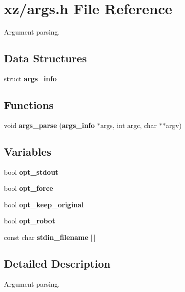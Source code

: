 \section{xz/args.h File Reference}
\label{args_8h}


Argument parsing.  


\subsection*{Data Structures}
\begin{DoxyCompactItemize}
\item 
struct {\bf args\-\_\-info}
\end{DoxyCompactItemize}
\subsection*{Functions}
\begin{DoxyCompactItemize}
\item 
void {\bfseries args\-\_\-parse} ({\bf args\-\_\-info} $\ast$args, int argc, char $\ast$$\ast$argv)\label{args_8h_a05c34191dc1aba862787f62481139730}

\end{DoxyCompactItemize}
\subsection*{Variables}
\begin{DoxyCompactItemize}
\item 
bool {\bfseries opt\-\_\-stdout}\label{args_8h_a9adffaea369e78666c7b50bfce10c764}

\item 
bool {\bfseries opt\-\_\-force}\label{args_8h_ae77f19014fc2e31a20d7e3e3a2224dc5}

\item 
bool {\bfseries opt\-\_\-keep\-\_\-original}\label{args_8h_a631cfa4029ae02603ce134e84262fa23}

\item 
bool {\bfseries opt\-\_\-robot}\label{args_8h_a4048d9a6b2322c886d91932f63cb7c2b}

\item 
const char {\bfseries stdin\-\_\-filename} [$\,$]\label{args_8h_a634a0202402ef35c039505443288e738}

\end{DoxyCompactItemize}


\subsection{Detailed Description}
Argument parsing. 